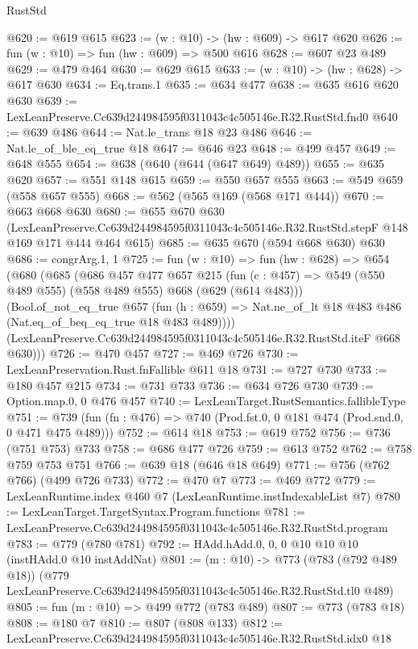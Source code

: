 \begin{lexlean}{RustStd}
\begin{coremodule}
@620 := @619 @615
@623 := (w : @10) -> (hw : @609) -> @617 @620
@626 := fun (w : @10) => fun (hw : @609) => @500 @616
@628 := @607 @23 @489
@629 := @479 @464
@630 := @629 @615
@633 := (w : @10) -> (hw : @628) -> @617 @630
@634 := Eq.trans.{1}
@635 := @634 @477
@638 := @635 @616 @620 @630
@639 := LexLeanPreserve.Cc639d244984595f0311043c4c505146e.R32.RustStd.fnd0
@640 := @639 @486
@644 := Nat.le_trans @18 @23 @486
@646 := Nat.le_of_ble_eq_true @18
@647 := @646 @23
@648 := @499 @457
@649 := @648 @555
@654 := @638 (@640 (@644 (@647 @649) @489))
@655 := @635 @620
@657 := @551 @148 @615
@659 := @550 @657 @555
@663 := @549 @659 (@558 @657 @555)
@668 := @562 (@565 @169 (@568 @171 @444))
@670 := @663 @668 @630
@680 := @655
    @670
    @630
    (LexLeanPreserve.Cc639d244984595f0311043c4c505146e.R32.RustStd.stepF
      @148
      @169
      @171
      @444
      @464
      @615)
@685 := @635 @670 (@594 @668 @630) @630
@686 := congrArg.{1, 1}
@725 := fun (w : @10) =>
  fun (hw : @628) =>
  @654
    (@680
      (@685
        (@686
          @457
          @477
          @657
          @215
          (fun (c : @457) => @549 (@550 @489 @555) (@558 @489 @555) @668 (@629 (@614 @483)))
          (Bool.of_not_eq_true
            @657
            (fun (h : @659) => Nat.ne_of_lt @18 @483 @486 (Nat.eq_of_beq_eq_true @18 @483 @489))))
        (LexLeanPreserve.Cc639d244984595f0311043c4c505146e.R32.RustStd.iteF @668 @630)))
@726 := @470 @457
@727 := @469 @726
@730 := LexLeanPreservation.Rust.fnFallible @611 @18
@731 := @727 @730
@733 := @180 @457 @215
@734 := @731 @733
@736 := @634 @726 @730
@739 := Option.map.{0, 0} @476 @457
@740 := LexLeanTarget.RustSemantics.fallibleType
@751 := @739 (fun (fn : @476) => @740 (Prod.fst.{0, 0} @181 @474 (Prod.snd.{0, 0} @471 @475 @489)))
@752 := @614 @18
@753 := @619 @752
@756 := @736 (@751 @753) @733
@758 := @686 @477 @726
@759 := @613 @752
@762 := @758 @759 @753 @751
@766 := @639 @18 (@646 @18 @649)
@771 := @756 (@762 @766) (@499 @726 @733)
@772 := @470 @7
@773 := @469 @772
@779 := LexLeanRuntime.index @460 @7 (LexLeanRuntime.instIndexableList @7)
@780 := LexLeanTarget.TargetSyntax.Program.functions
@781 := LexLeanPreserve.Cc639d244984595f0311043c4c505146e.R32.RustStd.program
@783 := @779 (@780 @781)
@792 := HAdd.hAdd.{0, 0, 0} @10 @10 @10 (instHAdd.{0} @10 instAddNat)
@801 := (m : @10) ->
  @773
    (@783 (@792 @489 @18))
    (@779 LexLeanPreserve.Cc639d244984595f0311043c4c505146e.R32.RustStd.tl0 @489)
@805 := fun (m : @10) => @499 @772 (@783 @489)
@807 := @773 (@783 @18)
@808 := @180 @7
@810 := @807 (@808 @133)
@812 := LexLeanPreserve.Cc639d244984595f0311043c4c505146e.R32.RustStd.idx0 @18

\end{coremodule}
\end{lexlean}
